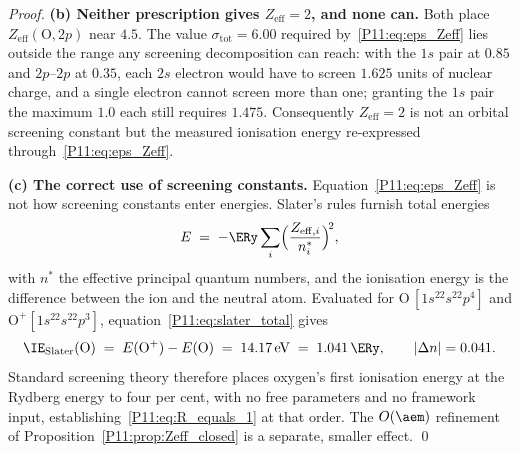 \begin{proof}
\textbf{(b) Neither prescription gives $Z_\mathrm{eff}=2$, and none can.}
Both place $Z_\mathrm{eff}(\mathrm{O},2p)$ near $4.5$.  The value
$\sigma_\mathrm{tot}=6.00$ required by~\eqref{P11:eq:eps_Zeff} lies
outside the range any screening decomposition can reach: with the $1s$
pair at $0.85$ and $2p$--$2p$ at $0.35$, each $2s$ electron would have
to screen $1.625$ units of nuclear charge, and a single electron cannot
screen more than one; granting the $1s$ pair the maximum $1.0$ each
still requires $1.475$.  Consequently $Z_\mathrm{eff}=2$ is not an
orbital screening constant but the measured ionisation energy
re-expressed through~\eqref{P11:eq:eps_Zeff}.

\textbf{(c) The correct use of screening constants.}
Equation~\eqref{P11:eq:eps_Zeff} is not how screening constants enter
energies.  Slater's rules furnish total energies
\begin{equation}
  E \;=\; -\ERy \sum_i \Bigl(\frac{Z_{\mathrm{eff},i}}{n^*_i}\Bigr)^{\!2},
  \label{P11:eq:slater_total}
\end{equation}
with $n^*$ the effective principal quantum numbers, and the ionisation
energy is the difference between the ion and the neutral atom.
Evaluated for $\mathrm{O}\,[1s^22s^22p^4]$ and
$\mathrm{O}^+[1s^22s^22p^3]$, equation~\eqref{P11:eq:slater_total}
gives
\begin{equation}
  \IE_\mathrm{Slater}(\mathrm{O})
  \;=\; E(\mathrm{O}^+) - E(\mathrm{O})
  \;=\; 14.17\,\mathrm{eV}
  \;=\; 1.041\,\ERy,
  \qquad
  |\Delta n| = 0.041 .
  \label{P11:eq:IE_slater_total}
\end{equation}
Standard screening theory therefore places oxygen's first ionisation
energy at the Rydberg energy to four per cent, with no free parameters
and no framework input, establishing~\eqref{P11:eq:R_equals_1} at that
order.  The $O(\aem)$ refinement of
Proposition~\ref{P11:prop:Zeff_closed} is a separate, smaller effect.
\qed
\end{proof}



